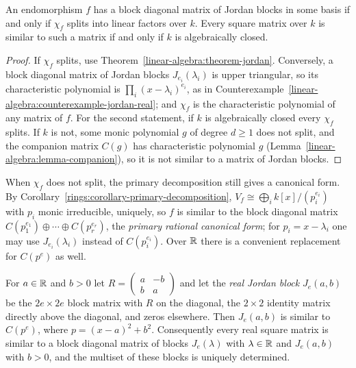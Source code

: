\begin{proposition}\label{linear-algebra:proposition-jordan-exists}
An endomorphism $f$ has a block diagonal matrix of Jordan blocks in some basis if and only if
$\chi_f$ splits into linear factors over $k$. Every square matrix over $k$ is similar to such a
matrix if and only if $k$ is algebraically closed.
\end{proposition}

\begin{proof}
If $\chi_f$ splits, use Theorem~\ref{linear-algebra:theorem-jordan}. Conversely, a block diagonal
matrix of Jordan blocks $J_{e_i}(\lambda_i)$ is upper triangular, so its characteristic polynomial
is $\prod_i(x - \lambda_i)^{e_i}$, as in Counterexample~\ref{linear-algebra:counterexample-jordan-real}; and
$\chi_f$ is the characteristic polynomial of any matrix of $f$. For the second statement, if $k$
is algebraically closed every $\chi_f$ splits. If $k$ is not, some monic polynomial $g$ of degree
$d \geq 1$ does not split, and the companion matrix $C(g)$ has characteristic polynomial $g$
(Lemma~\ref{linear-algebra:lemma-companion}), so it is not similar to a matrix of Jordan blocks.
\end{proof}

When $\chi_f$ does not split, the primary decomposition still gives a canonical form. By
Corollary~\ref{rings:corollary-primary-decomposition}, $V_f \cong \bigoplus_ik[x]/(p_i^{e_i})$ with $p_i$
monic irreducible, uniquely, so $f$ is similar to the block diagonal matrix
$C(p_1^{e_1}) \oplus \cdots \oplus C(p_r^{e_r})$, the \emph{primary rational canonical form}; for
$p_i = x - \lambda_i$ one may use $J_{e_i}(\lambda_i)$ instead of $C(p_i^{e_i})$. Over $\mathbb{R}$ there is a
convenient replacement for $C(p^e)$ as well.

\begin{proposition}\label{linear-algebra:proposition-real-jordan}
For $a \in \mathbb{R}$ and $b > 0$ let $R = \begin{pmatrix} a & -b \\ b & a \end{pmatrix}$ and let the
\emph{real Jordan block} $J_e(a, b)$ be the $2e \times 2e$ block matrix with $R$ on the diagonal, the
$2 \times 2$ identity matrix directly above the diagonal, and zeros elsewhere. Then $J_e(a, b)$ is
similar to $C(p^e)$, where $p = (x - a)^2 + b^2$. Consequently every real square matrix is similar
to a block diagonal matrix of blocks $J_e(\lambda)$ with $\lambda \in \mathbb{R}$ and $J_e(a, b)$ with
$b > 0$, and the multiset of these blocks is uniquely determined.
\end{proposition}

